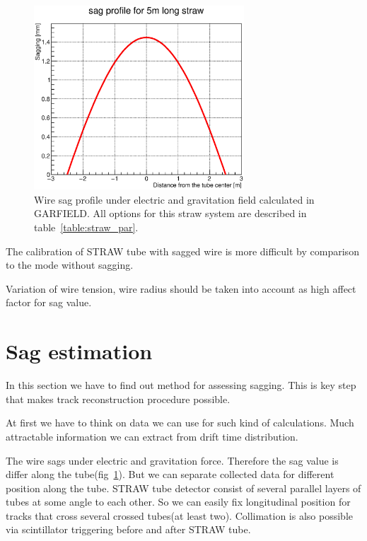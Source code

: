 \documentclass[]{article}
\begin{document}
	\begin{figure}[h!]
	\centering
	\includegraphics[width=0.7\textwidth]{sagProfileFit.eps}
	\caption{Wire sag profile under electric and gravitation field calculated in GARFIELD. All options for this straw system are described in table~\ref{table:straw_par}.}
	\label{fig:sagProfile}
	\end{figure}	
	
	The calibration of STRAW tube with sagged wire is more difficult by comparison to the mode without sagging. 
	
	Variation of wire tension, wire radius should be taken into account as high affect factor for sag value.
	
	\section{Sag estimation}

	In this section we have to find out method for assessing sagging. This is key step that makes track reconstruction procedure possible.
	
	At first we have to think on data we can use for such kind of calculations. Much attractable information we can extract from drift time distribution. 
	
	The wire sags under electric and gravitation force. Therefore the sag value is differ along the tube(fig~\ref{fig:sagProfile}). But we can separate collected data for different position along the tube. STRAW tube detector consist of several parallel layers of tubes at some angle to each other. So we can easily fix longitudinal position  for tracks that cross several crossed tubes(at least two). Collimation is also possible via scintillator triggering before and after STRAW tube.
	
\end{document}
